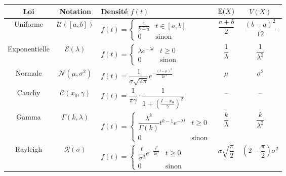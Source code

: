 \begin{table}[h]
    \centering
    \renewcommand{\arraystretch}{1.4}
    \begin{tabularx}{\textwidth}{|c|c|X|c|c|}
        \hline
        \textbf{Loi} & \textbf{Notation} & \textbf{Densité $f(t)$} & \textbf{$\mathbb{E}(X)$} & \textbf{$V(X)$} \\
        \hline

        Uniforme & $\mathcal{U}([a,b])$ & 
        $f(t) = \begin{cases}
            \frac{1}{b-a} & t \in [a,b] \\
            0 & \text{sinon}
        \end{cases}$ & 
        $\dfrac{a + b}{2}$ & 
        $\dfrac{(b-a)^2}{12}$ \\
        \hline

        Exponentielle & $\mathcal{E}(\lambda)$ & 
        $f(t) = \begin{cases}
            \lambda e^{-\lambda t} & t \geq 0 \\
            0 & \text{sinon}
        \end{cases}$ & 
        $\dfrac{1}{\lambda}$ & 
        $\dfrac{1}{\lambda^2}$ \\
        \hline

        Normale & $\mathcal{N}(\mu, \sigma^2)$ & 
        $f(t) = \dfrac{1}{\sigma \sqrt{2\pi}} e^{ - \frac{(t - \mu)^2}{2\sigma^2} }$ & 
        $\mu$ & 
        $\sigma^2$ \\
        \hline

        Cauchy & $\mathcal{C}(x_0, \gamma)$ & 
        $f(t) = \dfrac{1}{\pi \gamma} \cdot \dfrac{1}{1 + \left( \frac{t - x_0}{\gamma} \right)^2}$ & 
        -- & 
        -- \\
        \hline

        Gamma & $\Gamma(k, \lambda)$ & 
        $f(t) = \begin{cases}
            \dfrac{\lambda^k}{\Gamma(k)} t^{k-1} e^{-\lambda t} & t \geq 0 \\
            0 & \text{sinon}
        \end{cases}$ & 
        $\dfrac{k}{\lambda}$ & 
        $\dfrac{k}{\lambda^2}$ \\
        \hline

        Rayleigh & $\mathcal{R}(\sigma)$ & 
        $f(t) = \begin{cases}
            \dfrac{t}{\sigma^2} e^{ -\frac{t^2}{2\sigma^2} } & t \geq 0 \\
            0 & \text{sinon}
        \end{cases}$ & 
        $\sigma \sqrt{\dfrac{\pi}{2}}$ & 
        $\left( 2 - \dfrac{\pi}{2} \right) \sigma^2$ \\
        \hline


\end{tabularx}
\end{table}
